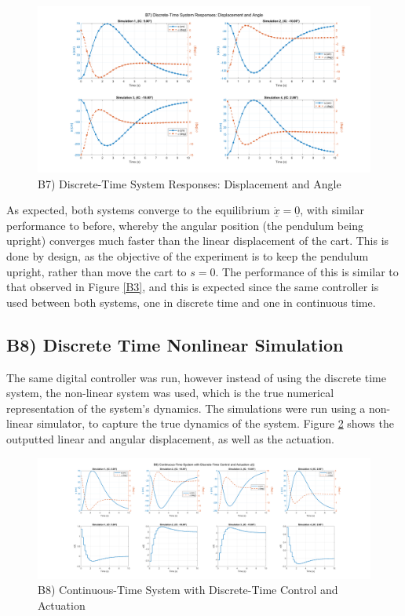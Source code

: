 \documentclass{article}
\begin{document}
\begin{figure}[H]
    \centering
    \includegraphics[width=\textwidth]{figures/B7_x.png}
    \caption{B7) Discrete-Time System Responses: Displacement and Angle}
    \label{B7}
\end{figure}

As expected, both systems converge to the equilibrium $\underline{\dot x}=\underline{0}$, with similar performance to before, whereby the angular position (the pendulum being upright) converges much faster than the linear displacement of the cart. This is done by design, as the objective of the experiment is to keep the pendulum upright, rather than move the cart to $s=0$. The performance of this is similar to that observed in Figure \ref{B3}, and this is expected since the same controller is used between both systems, one in discrete time and one in continuous time.

\subsection*{B8) Discrete Time Nonlinear Simulation}
The same digital controller was run, however instead of using the discrete time system, the non-linear system was used, which is the true numerical representation of the system's dynamics. The simulations were run using a non-linear simulator, to capture the true dynamics of the system. Figure \ref{B8} shows the outputted linear and angular displacement, as well as the actuation.

\begin{figure}[H]
    \centering
    \includegraphics[width=\textwidth]{figures/b8.png}
    \caption{B8) Continuous-Time System with Discrete-Time Control and Actuation}
    \label{B8}
\end{figure}
\end{document}
